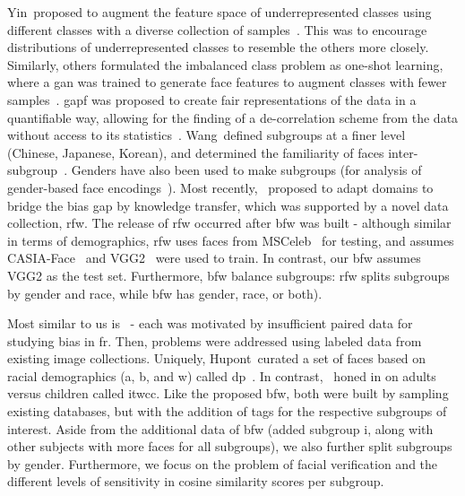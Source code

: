         Yin~\etal proposed to augment the feature space of underrepresented classes using different classes with a diverse collection of samples~\cite{yin2019feature}. This was to encourage distributions of underrepresented classes to resemble the others more closely. Similarly, others formulated the imbalanced class problem as one-shot learning, where a \gls{gan} was trained to generate face features to augment classes with fewer samples~\cite{ding2018one}. \gls{gapf} was proposed to create fair representations of the data in a quantifiable way, allowing for the finding of a de-correlation scheme from the data without access to its statistics~\cite{huang2018generative}. Wang~\etal defined subgroups at a finer level (\ie Chinese, Japanese, Korean), and determined the familiarity of faces inter-subgroup~\cite{wang2018they}. Genders have also been used to make subgroups (\eg for analysis of gender-based face encodings~\cite{muthukumar2019}). Most recently,~\cite{wang2018racial} proposed to adapt domains to bridge the bias gap by knowledge transfer, which was supported by a novel data collection, \gls{rfw}. The release of \gls{rfw} occurred after \gls{bfw} was built - although similar in terms of demographics, \gls{rfw} uses faces from MSCeleb~\cite{guo2016ms} for testing, and assumes CASIA-Face~\cite{yi2014learning} and VGG2~\cite{Cao18} were used to train. In contrast, our \gls{bfw} assumes VGG2 as the test set. 
        Furthermore, \gls{bfw} balance subgroups: \gls{rfw} splits subgroups by gender and race, while \gls{bfw} has gender, race, or both). 

    
Most similar to us is~\cite{das2018, demogPairs, lopez2019dataset, srinivas2019face} - each was motivated by insufficient paired data for studying bias in \gls{fr}. Then, problems were addressed using labeled data from existing image collections. Uniquely, Hupont~\etal curated a set of faces based on racial demographics (\ie \gls{a}, \gls{b}, and \gls{w}) called \gls{dp}~\cite{demogPairs}. In contrast,~\cite{srinivas2019face} honed in on adults versus children called \gls{itwcc}. Like the proposed \gls{bfw}, both were built by sampling existing databases, but with the addition of tags for the respective subgroups of interest. Aside from the additional data of \gls{bfw} (\ie added subgroup \gls{i}, along with other subjects with more faces for all subgroups), we also further split subgroups by gender. Furthermore, we focus on the problem of facial verification and the different levels of sensitivity in cosine similarity scores per subgroup.

